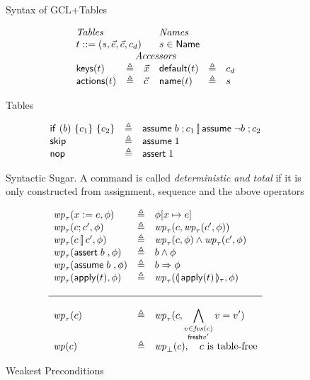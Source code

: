 \begin{figure}[ht]
  \caption{Syntax of GCL+Tables}
  \label{fig:syntaxgcl}
  
\end{figure}


\begin{figure}[ht]
  \[\begin{array}{l >{\triangleq}c l l >{\triangleq}c l}
      \multicolumn 3 l {\textit{Tables}}  & \multicolumn 3 l {\textit{Names}}\\
      \multicolumn 3 l {t::= (s,\vec e, \vec c, c_d)} & \multicolumn 3 l {s \in \Name}\\
      \multicolumn 6 c {\textit{Accessors}}\\
      \keys t && \vec x &  \default t && c_d \\
      \actions t && \vec c & \name t && s
    \end{array}\]

  \caption{Tables}
  \label{fig:tables}
\end{figure}

\begin{figure}[ht]
  \[\begin{array}{lcl}
      \mathsf{if}~(b)~\{c_1\}~\{c_2\} & \triangleq & \mathsf{assume}\; b\;;c_1 \operatorname*{\left[\!\right]} \mathsf{assume}\; \neg b\;; c_2 \\
      \mathsf{skip} & \triangleq& \mathsf{assume}\; 1\; \\
      \mathsf{nop} & \triangleq & \mathsf{assert}\; 1\;
    \end{array}
  \]
  \caption{Syntactic Sugar. A command is called \emph{deterministic
      and total} if it is only constructed from assignment, sequence
    and the above operators}
\end{figure}

\begin{figure}[ht]
  \[\begin{array}{l >{\triangleq}c l}
      \wp_\tau(x:=e, \phi) && \phi[x \mapsto e]\\
      \wp_\tau(c;c', \phi) && \wp_\tau(c, \wp_\tau(c', \phi)) \\
      \wp_\tau(c\angel c', \phi) && \wp_\tau(c, \phi) \wedge \wp_\tau(c',\phi) \\
      \wp_\tau(\assert b, \phi) && b \wedge \phi \\
      \wp_\tau(\assume b, \phi) && b \Rightarrow \phi \\
      \wp_\tau(\apply t, \phi) && \wp_\tau(\parenbb{\apply t}_\tau, \phi)\\\\\hline\\
      
      \wp_\tau(c) && \wp_\tau(c,\displaystyle \bigwedge_{\substack{v \in \fvs(c) \\ \mathsf{fresh} v'}} v = v') \\
      \wp(c) && \wp_\bot(c), \quad c \text{ is table-free}
    \end{array}\]
  \caption{Weakest Preconditions}
  \label{fig:wp}
\end{figure}


